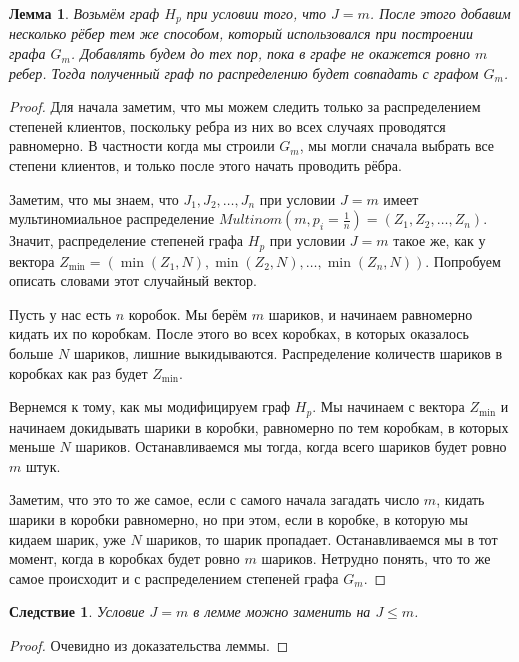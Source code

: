\documentclass[10pt]{article}
\newcommand{\leqs}{\leqslant}
\newtheorem{cons}{Следствие}
\newtheorem{lemma}{Лемма}
\theoremstyle{named}
\begin{document}
\begin{lemma} \label{l2}
Возьмём граф $H_p$ при условии того, что $J = m$. 
После этого добавим несколько рёбер тем же способом, который использовался при построении графа $G_m$. 
Добавлять будем до тех пор, пока в графе не окажется ровно $m$ ребер. 
Тогда полученный граф по распределению будет совпадать с графом $G_m$.
\end{lemma}
\begin{proof}
Для начала заметим, что мы можем следить только за распределением степеней клиентов, 
поскольку ребра из них во всех случаях проводятся равномерно. В частности когда мы строили $G_m$, 
мы могли сначала выбрать все степени клиентов, и только после этого начать проводить рёбра.

Заметим, что мы знаем, что $J_1, J_2, \dots, J_n$ при условии $J = m$ имеет мультиномиальное распределение 
$Multinom(m, p_i=\frac{1}{n}) = (Z_1, Z_2, \dots, Z_n)$. Значит, распределение степеней графа $H_p$ при условии $J = m$ такое же,
как у вектора $Z_{\min} = (\min(Z_1, N), \min(Z_2, N), \dots, \min(Z_n, N))$.
Попробуем описать словами этот случайный вектор.

Пусть у нас есть $n$ коробок. Мы берём $m$ шариков, и начинаем равномерно кидать их по коробкам. 
После этого во всех коробках, в которых оказалось больше $N$ шариков, лишние выкидываются.
Распределение количеств шариков в коробках как раз будет $Z_{\min}$. 

Вернемся к тому, как мы модифицируем граф $H_p$. Мы начинаем с вектора $Z_{\min}$ и начинаем докидывать шарики в коробки, 
равномерно по тем коробкам, в которых меньше $N$ шариков. Останавливаемся мы тогда, когда всего шариков будет ровно $m$ штук.

Заметим, что это то же самое, если с самого начала загадать число $m$, кидать шарики в коробки равномерно, 
но при этом, если в коробке, в которую мы кидаем шарик, уже $N$ шариков, то шарик пропадает. 
Останавливаемся мы в тот момент, когда в коробках будет ровно $m$ шариков. 
Нетрудно понять, что то же самое происходит и с распределением степеней графа $G_m$.
\end{proof}

\begin{cons} \label{cons_1}
Условие $J = m$ в лемме можно заменить на $J \leqs m$.
\end{cons}
\begin{proof}
Очевидно из доказательства леммы.
\end{proof}
\end{document}
